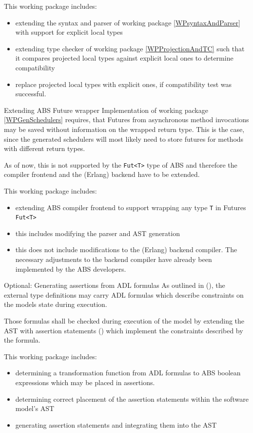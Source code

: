 \documentclass[paper=a4,nochapname,accentcolor=tud9c]{tudexercise}
\makeatletter
\newcommand\textcitep[1]{\mkbibparens{\textcite{#1}}}
\def\namedlabel#1#2{\begingroup
    #1%
    \def\@currentlabel{\thedescriptcount}%
    \phantomsection\label{#2}\endgroup
}
\newcounter{descriptcount}
\renewcommand*\thedescriptcount{[\Alph{descriptcount}]}}
\renewcommand*\thedescriptcount{\roman{descriptcount}}}
\makeatother
\begin{document}
\begin{enumdescript}
    This working package includes:
    \begin{itemize}
      \item extending the syntax and parser of working package \ref{WPsyntaxAndParser}
        with support for explicit local types
      \item extending type checker of working package \ref{WPProjectionAndTC} such
        that it compares projected local types against explicit local ones to
        determine compatibility
      \item replace projected local types with explicit ones, if compatibility
        test was successful.
    \end{itemize}
  \item[\namedlabel{Extending ABS Future wrapper}{WPAnyFut}]%
    Implementation of working package \ref{WPGenSchedulers} requires, that Futures
    from asynchronous method invocations may be saved without information on the
    wrapped return type. This is the case, since the generated schedulers will
    most likely need to store futures for methods with different return types.

    As of now, this is not supported by the \texttt{Fut<T>} type of ABS and
    therefore the compiler frontend and the (Erlang) backend have to be extended.

    This working package includes:
    \begin{itemize}
      \item extending ABS compiler frontend to support wrapping any type
        \texttt{T} in Futures \texttt{Fut<T>}
      \item this includes modifying the parser and AST generation
        \item this does not include modifications to the (Erlang) backend
          compiler. The necessary adjustments to the backend compiler have
          already been implemented by the ABS developers. %
    \end{itemize}
  \item[\namedlabel{Optional: Generating assertions from ADL formulas}{WPAssertions}]%
    As outlined in \textcitep{kamburjan2018stateful}, the external type definitions
    may carry ADL formulas which describe constraints on the models state during 
    execution.

    Those formulas shall be checked during execution of the model by extending
    the AST with assertion statements \textcitep{absassertions} which implement the
    constraints described by the formula.

    This working package includes:
    \begin{itemize}
      \item determining a transformation function from ADL formulas to ABS
        boolean expressions which may be placed in assertions.
      \item determining correct placement of the assertion statements within
        the software model's AST
      \item generating assertion statements and integrating them into the AST
    \end{itemize}
\end{enumdescript}
\end{document}
